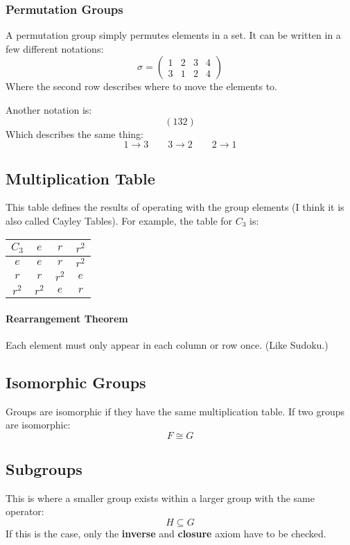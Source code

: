 \documentclass[12pt]{article}
\begin{document}
\subsubsection{Permutation Groups}
A permutation group simply permutes elements in a set. It can be written in a few different notations:
\[ \sigma = 
\begin{pmatrix}
1 & 2 & 3 & 4\\
3 & 1 & 2 & 4
\end{pmatrix}\]
Where the second row describes where to move the elements to.

Another notation is:
\[ (132) \]
Which describes the same thing:
\[ 1 \to 3 \qquad 3 \to 2 \qquad 2\to 1\]
\subsection{Multiplication Table}
This table defines the results of operating with the group elements (I think it is also called Cayley Tables). For example, the table for $C_3$ is:

\begin{table}[h]
    \centering
    \begin{tabular}{c|ccc}
         $C_3$ & $e$ & $r$ & $r^2$  \\
         \hline
         $e$ & $e$ & $r$ & $r^2$\\
         $r$ & $r$ & $r^2$ & $e$\\
         $r^2$& $r^2$ & $e$ & $r$
    \end{tabular}
    \label{tab:c3}
\end{table}

\paragraph{Rearrangement Theorem}
Each element must only appear in each column or row once. (Like Sudoku.)

\subsection{Isomorphic Groups}
Groups are isomorphic if they have the same multiplication table. If two groups are isomorphic:
\[ F \cong G\]



\subsection{Subgroups}
This is where a smaller group exists within a larger group with the same operator:
\[ H \subseteq G\]
If this is the case, only the \textbf{inverse} and \textbf{closure} axiom have to be checked.
\end{document}
